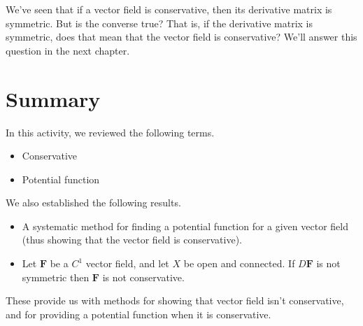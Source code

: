 \documentclass{ximera}
\begin{document}
We've seen that if a vector field is conservative, then its derivative matrix is symmetric. But is the converse true? That is, if the derivative matrix is symmetric, does that mean that the vector field is conservative? We'll answer this question in the next chapter.

\section{Summary}

In this activity, we reviewed the following terms.
\begin{itemize}
\item Conservative
\item Potential function
\end{itemize}

We also established the following results.
\begin{itemize}
\item A systematic method for finding a potential function for a given vector field (thus showing that the vector field is conservative).
\item Let $\mathbf{F}$ be a $C^1$ vector field, and let $X$ be open and connected. If $D\mathbf{F}$ is not symmetric then $\mathbf{F}$ is not conservative.
\end{itemize}

These provide us with methods for showing that vector field isn't conservative, and for providing a potential function when it is conservative.
\end{document}
